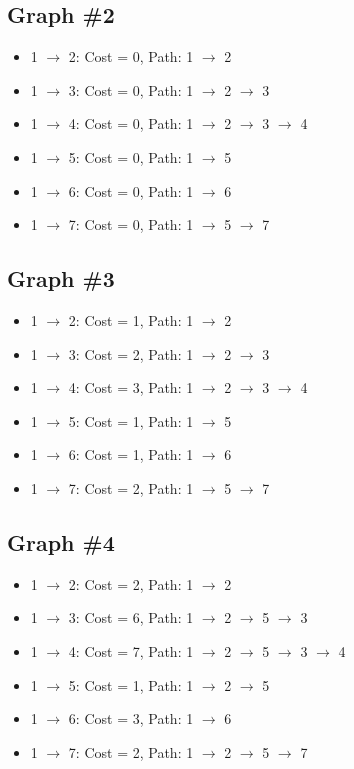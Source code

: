 \documentclass[12pt,letterpaper, onecolumn]{exam}
\begin{document}
\subsection*{Graph \#2}
\begin{itemize}[noitemsep, topsep=0pt]
    \item 1 $\rightarrow$ 2: Cost = 0, Path: 1 $\rightarrow$ 2
    \item 1 $\rightarrow$ 3: Cost = 0, Path: 1 $\rightarrow$ 2 $\rightarrow$ 3
    \item 1 $\rightarrow$ 4: Cost = 0, Path: 1 $\rightarrow$ 2 $\rightarrow$ 3 $\rightarrow$ 4
    \item 1 $\rightarrow$ 5: Cost = 0, Path: 1 $\rightarrow$ 5
    \item 1 $\rightarrow$ 6: Cost = 0, Path: 1 $\rightarrow$ 6
    \item 1 $\rightarrow$ 7: Cost = 0, Path: 1 $\rightarrow$ 5 $\rightarrow$ 7
\end{itemize}

\subsection*{Graph \#3}
\begin{itemize}[noitemsep, topsep=0pt]
    \item 1 $\rightarrow$ 2: Cost = 1, Path: 1 $\rightarrow$ 2
    \item 1 $\rightarrow$ 3: Cost = 2, Path: 1 $\rightarrow$ 2 $\rightarrow$ 3
    \item 1 $\rightarrow$ 4: Cost = 3, Path: 1 $\rightarrow$ 2 $\rightarrow$ 3 $\rightarrow$ 4
    \item 1 $\rightarrow$ 5: Cost = 1, Path: 1 $\rightarrow$ 5
    \item 1 $\rightarrow$ 6: Cost = 1, Path: 1 $\rightarrow$ 6
    \item 1 $\rightarrow$ 7: Cost = 2, Path: 1 $\rightarrow$ 5 $\rightarrow$ 7
\end{itemize}

\subsection*{Graph \#4}
\begin{itemize}[noitemsep, topsep=0pt]
    \item 1 $\rightarrow$ 2: Cost = 2, Path: 1 $\rightarrow$ 2
    \item 1 $\rightarrow$ 3: Cost = 6, Path: 1 $\rightarrow$ 2 $\rightarrow$ 5 $\rightarrow$ 3
    \item 1 $\rightarrow$ 4: Cost = 7, Path: 1 $\rightarrow$ 2 $\rightarrow$ 5 $\rightarrow$ 3 $\rightarrow$ 4
    \item 1 $\rightarrow$ 5: Cost = 1, Path: 1 $\rightarrow$ 2 $\rightarrow$ 5
    \item 1 $\rightarrow$ 6: Cost = 3, Path: 1 $\rightarrow$ 6
    \item 1 $\rightarrow$ 7: Cost = 2, Path: 1 $\rightarrow$ 2 $\rightarrow$ 5 $\rightarrow$ 7
\end{itemize}
\end{document}
